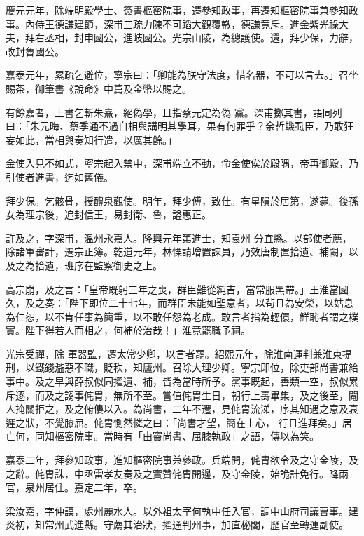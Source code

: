 \begin{pinyinscope}
 慶元元年，除端明殿學士、簽書樞密院事，遷參知政事，再遷知樞密院事兼參知政事。內侍王德謙建節，深甫三疏力陳不可蹈大觀覆轍，德謙竟斥。進金紫光祿大夫，拜右丞相，封申國公，進岐國公。光宗山陵，為總護使。還，拜少保，力辭，改封魯國公。



 嘉泰元年，累疏乞避位，寧宗曰：「卿能為朕守法度，惜名器，不可以言去。」召坐賜茶，御筆書《說命》中篇及金幣以賜之。



 有餘嘉者，上書乞斬朱熹，絕偽學，且指蔡元定為偽
 黨。深甫擲其書，語同列曰：「朱元晦、蔡季通不過自相與講明其學耳，果有何罪乎？余哲蟣虱臣，乃敢狂妄如此，當相與奏知行遣，以厲其餘。」



 金使入見不如式，寧宗起入禁中，深甫端立不動，命金使俟於殿隅，帝再御殿，乃引使者進書，迄如舊儀。



 拜少保。乞骸骨，授醴泉觀使。明年，拜少傅，致仕。有星隕於居第，遂薨。後孫女為理宗後，追封信王，易封衛、魯，謚惠正。



 許及之，字深甫，溫州永嘉人。隆興元年第進士，知袁州
 分宜縣。以部使者薦，除諸軍審計，遷宗正簿。乾道元年，林慄請增置諫員，乃效唐制置拾遺、補闕，以及之為拾遺，班序在監察御史之上。



 高宗崩，及之言：「皇帝既躬三年之喪，群臣難從純吉，當常服黑帶。」王淮當國久，及之奏：「陛下即位二十七年，而群臣未能如聖意者，以茍且為安榮，以姑息為仁恕，以不肯任事為簡重，以不敢任怨為老成。敢言者指為輕儇，鮮恥者謂之樸實。陛下得若人而相之，何補於治哉！」淮竟罷職予祠。



 光宗受禪，除
 軍器監，遷太常少卿，以言者罷。紹熙元年，除淮南運判兼淮東提刑，以鐵錢濫惡不職，貶秩，知廬州。召除大理少卿。寧宗即位，除吏部尚書兼給事中。及之早與薛叔似同擢遺、補，皆為當時所予。黨事既起，善類一空，叔似累斥逐，而及之謅事侂胄，無所不至。嘗值侂胄生日，朝行上壽畢集，及之後至，閹人掩關拒之，及之俯僂以入。為尚書，二年不遷，見侂胄流涕，序其知遇之意及衰遲之狀，不覺膝屈。侂胄惻然憐之曰：「尚書才望，簡在上心，
 行且進拜矣。」居亡何，同知樞密院事。當時有「由竇尚書、屈膝執政」之語，傳以為笑。



 嘉泰二年，拜參知政事，進知樞密院事兼參政。兵端開，侂胄欲令及之守金陵，及之辭。侂胄誅，中丞雷孝友奏及之實贊侂胄開邊，及守金陵，始詭計免行。降兩官，泉州居住。嘉定二年，卒。



 梁汝嘉，字仲謨，處州麗水人。以外祖太宰何執中任入官，調中山府司議曹事。建炎初，知常州武進縣。守薦其治狀，擢通判州事，加直秘閣，歷官至轉運副使。




\end{pinyinscope}
